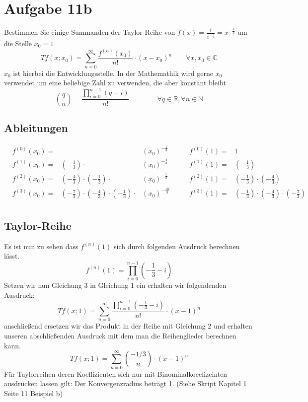 \documentclass[18pt,a4paper]{article}
\begin{document}
\section*{Aufgabe 11b}
Bestimmen Sie einige Summanden der Taylor-Reihe von $f(x)=\frac{1}{x^{-\frac{1}{3}}} = x^{-\frac{1}{3}}$ um die Stelle $x_0 = 1$
\begin{equation}
Tf(x;x_0)= \sum_{n=0}^{\infty}\frac{f^{(n)}(x_0)}{n!} \cdot (x-x_0)^n \qquad\forall x,x_0 \in \mathbb{C}
\end{equation}
$x_0$ ist hierbei die Entwicklungsstelle. In der Mathemathik wird gerne $x_0$ verwendet um eine beliebige Zahl zu verwenden, die aber konstant bleibt
\begin{equation}
\binom{q}{n} = \frac{\prod_{i=0}^{n-1}(q-i)}{n!} \qquad \qquad \forall q \in \mathbb{R},\forall n \in \mathbb{N}
\end{equation}
\subsection*{Ableitungen}
\begin{align*}
&f^{(0)}(x_0) =& &(x_0)^{-\frac{1}{3}} \qquad
&f^{(0)}(1) =& 1\\
&f^{(1)}(x_0) =& (-\frac{1}{3})\cdot&(x_0)^{-\frac{4}{3}} \qquad
&f^{(1)}(1) =& (-\frac{1}{3})\\
&f^{(2)}(x_0) =& (-\frac{4}{3})\cdot(-\frac{1}{3})\cdot&(x_0)^{-\frac{7}{3}} \qquad
&f^{(2)}(1) =& (-\frac{1}{3})\cdot(-\frac{4}{3})\\
&f^{(3)}(x_0) =& (-\frac{7}{3})\cdot(-\frac{4}{3})\cdot(-\frac{1}{3})\cdot&(x_0)^{-\frac{10}{3}} \qquad
&f^{(3)}(1) =& (-\frac{1}{3})\cdot(-\frac{4}{3})\cdot(-\frac{7}{3})\\
\end{align*}
\subsection*{Taylor-Reihe}
Es ist nun zu sehen dass  $f^{(n)}(1)$ sich durch folgenden Ausdruck berechnen lässt.
\begin{equation}
f^{(n)}(1) = \prod_{i=0}^{n-1}\left(-\frac{1}{3}-i\right)
\end{equation}
Setzen wir nun Gleichung 3 in Gleichung 1 ein erhalten wir folgendenden Ausdruck:
\begin{equation}
Tf(x;1)= \sum_{n=0}^{\infty}\frac{\prod_{i=0}^{n-1}\left(-\frac{1}{3}-i\right)}{n!} \cdot (x-1)^n
\end{equation}
anschließend ersetzen wir das Produkt in der Reihe mit Gleichung 2 und erhalten unseren abschließenden Ausdruck mit dem man die Reihenglieder berechnen kann.
\begin{equation}
Tf(x;1)= \sum_{n=0}^{\infty}\binom{-1/3}{n} \cdot (x-1)^n
\end{equation}
Für Taylorreihen deren Koeffizienten sich nur mit Binominalkoeefizeinten ausdrücken lassen gilt: Der Konvergenzradius beträgt 1. (Siehe Skript Kapitel 1 Seite 11 Beispiel b)
\end{document}
